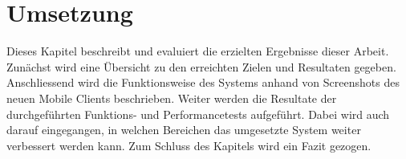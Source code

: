 \section{Umsetzung}

Dieses Kapitel beschreibt und evaluiert die erzielten Ergebnisse dieser Arbeit.
Zunächst wird eine Übersicht zu den erreichten Zielen und Resultaten gegeben.
Anschliessend wird die Funktionsweise des Systems anhand von Screenshots des neuen Mobile Clients beschrieben.
Weiter werden die Resultate der durchgeführten Funktions- und Performancetests aufgeführt.
Dabei wird auch darauf eingegangen, in welchen Bereichen das umgesetzte System weiter verbessert werden kann.
Zum Schluss des Kapitels wird ein Fazit gezogen.





\clearpage
